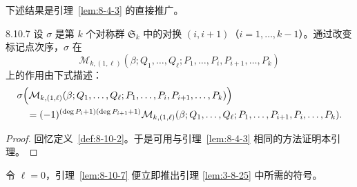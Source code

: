 下述结果是引理~\ref{lem:8-4-3} 的直接推广。

\begin{lemma}{8.10.7}\label{lem:8-10-7}
设 $\sigma$ 是第 $k$ 个对称群 $\mathfrak S_k$ 中的对换
$(i,i+1)$（$i=1,\ldots,k-1$）。通过改变标记点次序，$\sigma$ 在
\[
 \mathcal M_{k,(1,\ell)}
 (\beta;Q_1,\ldots,Q_\ell;P_1,\ldots,P_i,P_{i+1},\ldots,P_k)
\]
上的作用由下式描述：
\[
\begin{aligned}
&\sigma\Bigl(
\mathcal M_{k,(1,\ell)}
(\beta;Q_1,\ldots,Q_\ell;P_1,\ldots,P_i,P_{i+1},\ldots,P_k)
\Bigr)\\
&\quad={}
(-1)^{(\deg P_i+1)(\deg P_{i+1}+1)}
\mathcal M_{k,(1,\ell)}
(\beta;Q_1,\ldots,Q_\ell;P_1,\ldots,P_{i+1},P_i,\ldots,P_k).
\end{aligned}
\]
\end{lemma}

\begin{proof}
回忆定义~\ref{def:8-10-2}。于是可用与引理~\ref{lem:8-4-3}
相同的方法证明本引理。
\end{proof}

令 $\ell=0$，引理~\ref{lem:8-10-7} 便立即推出引理
\ref{lem:3-8-25} 中所需的符号。
